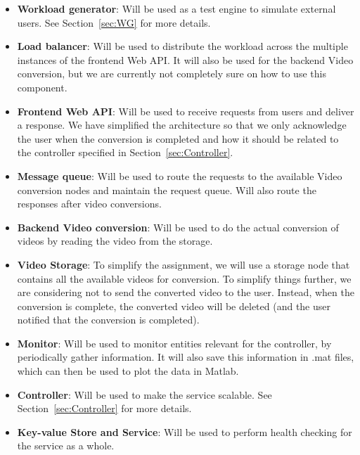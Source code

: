 \documentclass[a4paper, 10pt, english]{article}
\begin{document}
\begin{itemize}
	\item \textbf{Workload generator}: Will be used as a test engine to simulate external users. See Section~\ref{sec:WG} for more details.
	\item \textbf{Load balancer}: Will be used to distribute the workload across the multiple instances of the frontend Web API. It will also be used for the backend Video conversion, but we are currently not completely sure on how to use this component. 
	\item \textbf{Frontend Web API}: Will be used to receive requests from users and deliver a response. We have simplified the architecture so that we only acknowledge the user when the conversion is completed and how it should be related to the controller specified in Section~\ref{sec:Controller}.
	\item \textbf{Message queue}: Will be used to route the requests to the available Video conversion nodes and maintain the request queue. Will also route the responses after video conversions.
	\item \textbf{Backend Video conversion}: Will be used to do the actual conversion of videos by reading the video from the storage.
	\item \textbf{Video Storage}: To simplify the assignment, we will use a storage node that contains all the available videos for conversion. To simplify things further, we are considering not to send the converted video to the user. Instead, when the conversion is complete, the converted video will be deleted (and the user notified that the conversion is completed).
	\item \textbf{Monitor}: Will be used to monitor entities relevant for the controller, by periodically gather information. It will also save this information in .mat files, which can then be used to plot the data in Matlab. 
	\item \textbf{Controller}: Will be used to make the service scalable. See Section~\ref{sec:Controller} for more details.
	\item \textbf{Key-value Store and Service}: Will be used to perform health checking for the service as a whole.	
\end{itemize}
\end{document}
